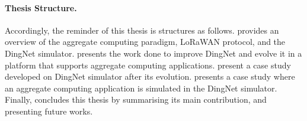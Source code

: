 \paragraph{Thesis Structure.} %
Accordingly, the reminder of this thesis is structures as follows.
%
 provides an overview of the aggregate computing paradigm, \mbox{LoRaWAN} protocol, and the DingNet simulator.
%
 presents the work done to improve DingNet and evolve it in a platform that supports aggregate computing applications.
%
 present a case study developed on DingNet simulator after its evolution.
% 
 presents a case study where an aggregate computing application is simulated in the DingNet simulator.
% 
Finally,  concludes this thesis by summarising its main contribution, and presenting future works.